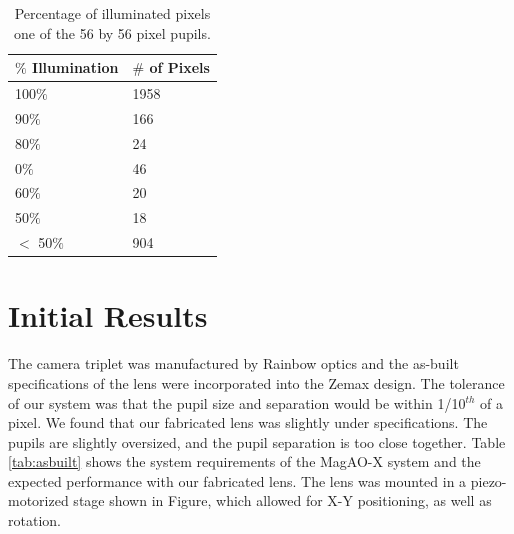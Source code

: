 \begin{table}[h]
	\begin{center}       
		\begin{tabular}{|l|l|} %
				
				\hline%
				\rule[-1ex]{0pt}{3.5ex} $\%$ \textbf{Illumination} & \textbf{$\#$ of Pixels }  \\
				
				\hline%
				\rule[-1ex]{0pt}{3.5ex} 100$\%$ & 1958  \\
				\hline%
				\rule[-1ex]{0pt}{3.5ex} 90$\%$ & 166  \\
				\hline%
				\rule[-1ex]{0pt}{3.5ex} 80$\%$ & 24  \\
				\hline%
				\rule[-1ex]{0pt}{3.5ex} 0$\%$ & 46  \\
				\hline%
				\rule[-1ex]{0pt}{3.5ex} 60$\%$ & 20  \\
				\hline%
				\rule[-1ex]{0pt}{3.5ex} 50$\%$ & 18  \\
				\hline%
				\rule[-1ex]{0pt}{3.5ex} $<$ 50$\%$ & 904  \\
				\hline
		\end{tabular}
	\end{center}
	\caption{Percentage of illuminated pixels one of the 56 by 56 pixel pupils. }
	\label{tab:actuators}
\end{table}
	
\section{Initial Results}
	
The camera triplet was manufactured by Rainbow optics and the as-built specifications of the lens were incorporated into the Zemax design. The tolerance of our system was that the pupil size and separation would be within 1/10$^{th}$ of a pixel. We found that our fabricated lens was slightly under specifications. The pupils are slightly oversized, and the pupil separation is too close together. Table \ref{tab:asbuilt} shows the system requirements of the MagAO-X system and the expected performance with our fabricated lens. The lens was mounted in a piezo-motorized stage shown in Figure, which allowed for X-Y positioning, as well as rotation. 
	
